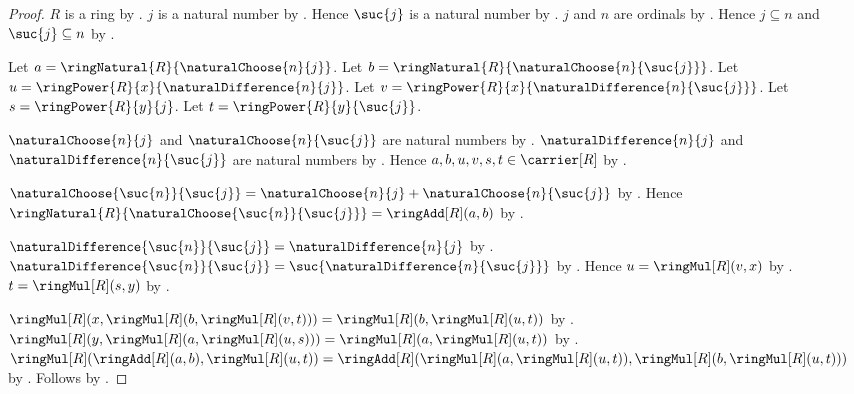 \begin{proof}
    $R$ is a ring by .
    $j$ is a natural number by
        .
    Hence $\suc{j}$ is a natural number by .
    $j$ and $n$ are ordinals by
        .
    Hence $j\subseteq n$ and $\suc{j}\subseteq n$ by
        .

    Let $a=\ringNatural{R}{\naturalChoose{n}{j}}$.
    Let $b=\ringNatural{R}{\naturalChoose{n}{\suc{j}}}$.
    Let $u=\ringPower{R}{x}{\naturalDifference{n}{j}}$.
    Let $v=\ringPower{R}{x}{\naturalDifference{n}{\suc{j}}}$.
    Let $s=\ringPower{R}{y}{j}$.
    Let $t=\ringPower{R}{y}{\suc{j}}$.

    $\naturalChoose{n}{j}$ and
        $\naturalChoose{n}{\suc{j}}$ are natural numbers by
        .
    $\naturalDifference{n}{j}$ and
        $\naturalDifference{n}{\suc{j}}$ are natural numbers by
        .
    Hence $a,b,u,v,s,t\in\carrier[R]$ by
        .

    $\naturalChoose{\suc{n}}{\suc{j}}
        =\naturalChoose{n}{j}+\naturalChoose{n}{\suc{j}}$ by
        .
    Hence
        $\ringNatural{R}{\naturalChoose{\suc{n}}{\suc{j}}}
            =\ringAdd[R](a,b)$ by
        .

    $\naturalDifference{\suc{n}}{\suc{j}}
        =\naturalDifference{n}{j}$ by
        .
    $\naturalDifference{\suc{n}}{\suc{j}}
        =\suc{\naturalDifference{n}{\suc{j}}}$ by
        .
    Hence $u=\ringMul[R](v,x)$ by
        .
    $t=\ringMul[R](s,y)$ by
        .

    $\ringMul[R](x,\ringMul[R](b,\ringMul[R](v,t)))
        =\ringMul[R](b,\ringMul[R](u,t))$ by
        .
    $\ringMul[R](y,\ringMul[R](a,\ringMul[R](u,s)))
        =\ringMul[R](a,\ringMul[R](u,t))$ by
        .
    $\ringMul[R](\ringAdd[R](a,b),\ringMul[R](u,t))
        =\ringAdd[R](
            \ringMul[R](a,\ringMul[R](u,t)),
            \ringMul[R](b,\ringMul[R](u,t)))$ by
        .
    Follows by
        .
\end{proof}


